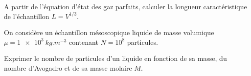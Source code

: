 \begin{enonce}
A partir de l’équation d'état des gaz parfaits, calculer la longueur caractéristique de l'échantillon $L=V^{1/3}$.
\end{enonce}





\finEntrainement











\hauteurLargeurCadreReponse		{8mm}{7cm}
\typeEntrainement				{} %
\initialisationEntrainement

On considère un échantillon mésoscopique liquide de masse volumique $\mu=\SI{1e3}{kg.m^{-3}}$ contenant $N=10^8$ particules.

\debutEntrainement




\begin{enonce}
Exprimer le nombre de particules d'un liquide en fonction de sa masse, du nombre d'Avogadro et de sa masse molaire $M$.
\end{enonce}


